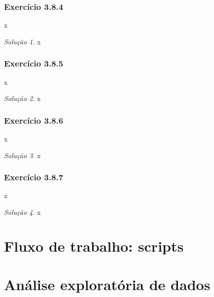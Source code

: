 \documentclass[
]{latex/krantz}
\theoremstyle{definition}
\theoremstyle{definition}
\theoremstyle{definition}
\theoremstyle{definition}
\theoremstyle{remark}
\newtheorem*{solution}{Solução}
\begin{document}
\hypertarget{exr3-8-4}{%
\subsection*{Exercício 3.8.4}\label{exr3-8-4}}

x

\begin{solution}
x
\end{solution}

\hypertarget{exr3-8-5}{%
\subsection*{Exercício 3.8.5}\label{exr3-8-5}}

x

\begin{solution}
x
\end{solution}

\hypertarget{exr3-8-6}{%
\subsection*{Exercício 3.8.6}\label{exr3-8-6}}

x

\begin{solution}
x
\end{solution}

\hypertarget{exr3-8-7}{%
\subsection*{Exercício 3.8.7}\label{exr3-8-7}}

x

\begin{solution}
x
\end{solution}

\hypertarget{fluxo-de-trabalho-scripts}{%
\chapter{Fluxo de trabalho: scripts}\label{fluxo-de-trabalho-scripts}}

\hypertarget{anuxe1lise-exploratuxf3ria-de-dados}{%
\chapter{Análise exploratória de dados}\label{anuxe1lise-exploratuxf3ria-de-dados}}
\end{document}

